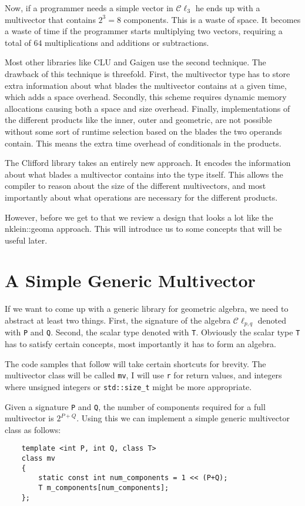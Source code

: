 \documentclass[10pt]{article}
\begin{document}
Now, if a programmer needs a simple vector in $\mathcal{C}\ell_{3}$ he ends up with a multivector that contains $2^3=8$ components. This is a waste of space. It becomes a waste of time if the programmer starts multiplying two vectors, requiring a total of $64$ multiplications and additions or subtractions.

Most other libraries like CLU \cite{bib:clu} and Gaigen \cite{bib:gaigen} use the second technique. The drawback of this technique is threefold. First, the multivector type has to store extra information about what blades the multivector contains at a given time, which adds a space overhead. Secondly, this scheme
requires dynamic memory allocations causing both a space and size overhead. Finally, implementations of the different products like the inner, outer and geometric, are not possible without some sort of runtime selection based on the blades the two operands contain. This means the extra time overhead of conditionals in the
products.

The Clifford library takes an entirely new approach. It encodes the information about what blades a multivector contains into the type itself. This allows the compiler to reason about the size of the different multivectors, and most importantly about what operations are necessary for the different products.

However, before we get to that we review a design that looks a lot like the nklein::geoma \cite{bib:nklein} approach. This will introduce us to some concepts that will be useful later.

\section{A Simple Generic Multivector}

If we want to come up with a generic library for geometric algebra, we need to abstract at least two things. First, the signature of the algebra $\mathcal{C}\ell_{p, q}$ denoted with \verb"P" and \verb"Q". Second, the scalar type denoted with \verb"T". Obviously the scalar type \verb"T" has to satisfy
certain concepts, most importantly it has to form an algebra.

The code samples that follow will take certain shortcuts for brevity. The multivector class will be called \verb"mv", I will use \verb"r" for return values, and integers where unsigned integers or \verb "std::size_t" might be more appropriate.

Given a signature \verb"P" and \verb"Q", the number of components required for a full multivector is $2^{P+Q}$. Using this we can implement a simple generic multivector class as follows:
\begin{verbatim}
    template <int P, int Q, class T>
    class mv
    {
        static const int num_components = 1 << (P+Q);
        T m_components[num_components];
    };
\end{verbatim}
\end{document}
